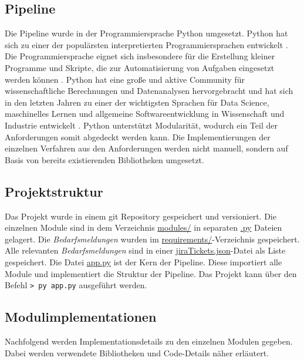 \subsection{Pipeline}
Die Pipeline wurde in der Programmiersprache Python umgesetzt. Python hat sich zu einer der populärsten interpretierten Programmiersprachen entwickelt \cite{mckinney2012python}. Die Programmiersprache eignet sich insbesondere für die Erstellung kleiner Programme und Skripte, die zur Automatisierung von Aufgaben eingesetzt werden können \cite{mckinney2012python}. Python hat eine große und aktive Community für wissenschaftliche Berechnungen und Datenanalysen hervorgebracht und hat sich in den letzten Jahren zu einer der wichtigsten Sprachen für Data Science, maschinelles Lernen und allgemeine Softwareentwicklung in Wissenschaft und Industrie entwickelt \cite{mckinney2012python}. Python unterstützt Modularität, wodurch ein Teil der Anforderungen somit abgedeckt werden kann. Die Implementierungen der einzelnen Verfahren aus den Anforderungen werden nicht manuell, sondern auf Basis von bereits existierenden Bibliotheken umgesetzt.
\subsection{Projektstruktur}
\label{sec:projektstruktur}
Das Projekt wurde in einem git Repository gespeichert und versioniert. %
Die einzelnen Module sind in dem Verzeichnis \url{modules/} in separaten \url{.py} Dateien gelagert. Die \emph{Bedarfsmeldungen} wurden im \url{requirements/}-Verzeichnis gespeichert. Alle relevanten \emph{Bedarfsmeldungen} sind in einer \url{jiraTickets.json}-Datei als Liste gespeichert. Die Datei \url{app.py} ist der Kern der Pipeline. Diese importiert alle Module und implementiert die Struktur der Pipeline. Das Projekt kann über den Befehl \lstinline{> py app.py} ausgeführt werden.
\subsection{Modulimplementationen}
Nachfolgend werden Implementationsdetails zu den einzelnen Modulen gegeben. Dabei werden verwendete Bibliotheken und Code-Details näher erläutert.
